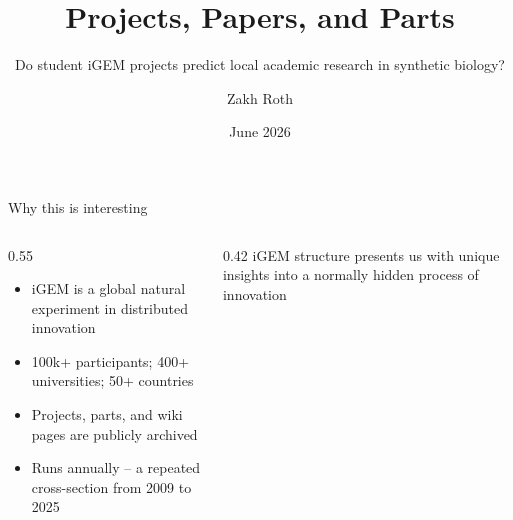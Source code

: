 \documentclass[10pt,aspectratio=169]{beamer}
\title{Projects, Papers, and Parts}
\subtitle{Do student iGEM projects predict local academic research in synthetic biology?}
\author{Zakh Roth}
\institute{Complexity Science Hub \\ Technical University of Munich}
\date{June 2026}
\begin{document}
\begin{frame}
  \titlepage
\end{frame}

\begin{frame}{Why this is interesting}

\begin{columns}[T]
\begin{column}{0.55\textwidth}
  \begin{itemize}
  	\item iGEM is a global natural experiment in distributed innovation
    \item 100k+ participants; 400+ universities; 50+ countries

    \item Projects, parts, and wiki pages are publicly archived
    \item Runs annually -- a repeated cross-section from 2009 to 2025
  \end{itemize}
\end{column}
\begin{column}{0.42\textwidth}
  \vspace{0.5em}
  {\large\textcolor{SolBase1}{iGEM structure presents us with unique insights into a normally hidden process of innovation}}
\end{column}
\end{columns}
\end{frame}

\end{document}

